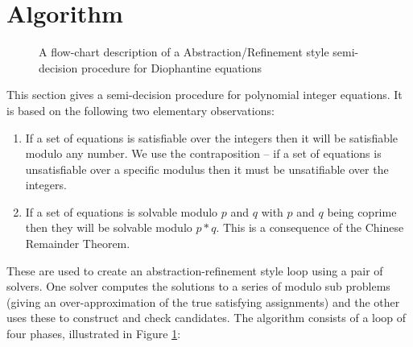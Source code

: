 \section{Algorithm}
\label{section:algorithm}

\begin{figure}[th]
  \begin{center}
      
  \end{center}
  \caption{A flow-chart description of a Abstraction/Refinement style semi-decision procedure for Diophantine equations}
  \label{figure:algorithm}
\end{figure}


This section gives a semi-decision procedure for polynomial integer
equations.
%
It is based on the following two elementary observations:
%
\begin{enumerate}
\item{If a set of equations is satisfiable over the integers then it
  will be satisfiable modulo any number.  We use the contraposition -- if a
  set of equations is unsatisfiable over a specific modulus then it
  must be unsatifiable over the integers.}
\item{If a set of equations is solvable modulo $p$ and $q$ with $p$ and
  $q$ being coprime then they will be solvable modulo $p*q$.  This is a
  consequence of the Chinese Remainder Theorem.}
\end{enumerate}
%
These are used to create an abstraction-refinement style loop using a pair
of solvers.  One solver computes the solutions to a series of modulo
sub problems (giving an over-approximation of the true satisfying
assignments) and the other uses these to construct and check candidates.
%
The algorithm consists of a loop of four phases, illustrated in Figure
\ref{figure:algorithm}:

